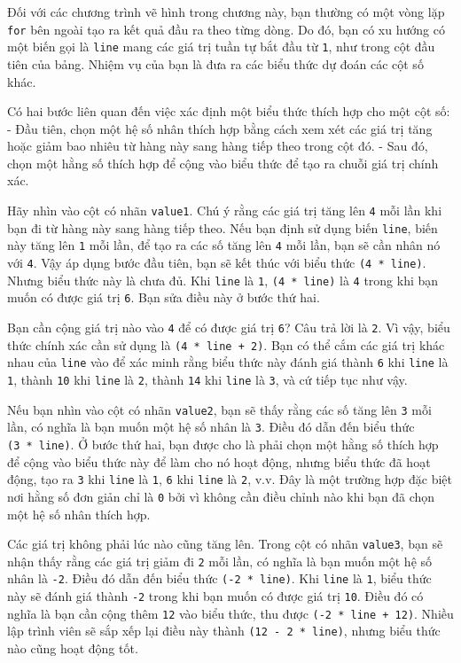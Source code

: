 Đối với các chương trình vẽ hình trong chương này, bạn thường có một
vòng lặp \texttt{for} bên ngoài tạo ra kết quả đầu ra theo từng dòng. Do
đó, bạn có xu hướng có một biến gọi là \texttt{line} mang các giá trị
tuần tự bắt đầu từ \texttt{1}, như trong cột đầu tiên của bảng. Nhiệm vụ
của bạn là đưa ra các biểu thức dự đoán các cột số khác.

Có hai bước liên quan đến việc xác định một biểu thức thích hợp cho một
cột số: - Đầu tiên, chọn một hệ số nhân thích hợp bằng cách xem xét các
giá trị tăng hoặc giảm bao nhiêu từ hàng này sang hàng tiếp theo trong
cột đó. - Sau đó, chọn một hằng số thích hợp để cộng vào biểu thức để
tạo ra chuỗi giá trị chính xác.

Hãy nhìn vào cột có nhãn \texttt{value1}. Chú ý rằng các giá trị tăng
lên \texttt{4} mỗi lần khi bạn đi từ hàng này sang hàng tiếp theo. Nếu
bạn định sử dụng biến \texttt{line}, biến này tăng lên \texttt{1} mỗi
lần, để tạo ra các số tăng lên \texttt{4} mỗi lần, bạn sẽ cần nhân nó
với \texttt{4}. Vậy áp dụng bước đầu tiên, bạn sẽ kết thúc với biểu thức
\texttt{(4\ *\ line)}. Nhưng biểu thức này là chưa đủ. Khi \texttt{line}
là \texttt{1}, \texttt{(4\ *\ line)} là \texttt{4} trong khi bạn muốn có
được giá trị \texttt{6}. Bạn sửa điều này ở bước thứ hai.

Bạn cần cộng giá trị nào vào \texttt{4} để có được giá trị \texttt{6}?
Câu trả lời là \texttt{2}. Vì vậy, biểu thức chính xác cần sử dụng là
\texttt{(4\ *\ line\ +\ 2)}. Bạn có thể cắm các giá trị khác nhau của
\texttt{line} vào để xác minh rằng biểu thức này đánh giá thành
\texttt{6} khi \texttt{line} là \texttt{1}, thành \texttt{10} khi
\texttt{line} là \texttt{2}, thành \texttt{14} khi \texttt{line} là
\texttt{3}, và cứ tiếp tục như vậy.

Nếu bạn nhìn vào cột có nhãn \texttt{value2}, bạn sẽ thấy rằng các số
tăng lên \texttt{3} mỗi lần, có nghĩa là bạn muốn một hệ số nhân là
\texttt{3}. Điều đó dẫn đến biểu thức \texttt{(3\ *\ line)}. Ở bước thứ
hai, bạn được cho là phải chọn một hằng số thích hợp để cộng vào biểu
thức này để làm cho nó hoạt động, nhưng biểu thức đã hoạt động, tạo ra
\texttt{3} khi \texttt{line} là \texttt{1}, \texttt{6} khi \texttt{line}
là \texttt{2}, v.v. Đây là một trường hợp đặc biệt nơi hằng số đơn giản
chỉ là \texttt{0} bởi vì không cần điều chỉnh nào khi bạn đã chọn một hệ
số nhân thích hợp.

Các giá trị không phải lúc nào cũng tăng lên. Trong cột có nhãn
\texttt{value3}, bạn sẽ nhận thấy rằng các giá trị giảm đi \texttt{2}
mỗi lần, có nghĩa là bạn muốn một hệ số nhân là \texttt{-2}. Điều đó dẫn
đến biểu thức \texttt{(-2\ *\ line)}. Khi \texttt{line} là \texttt{1},
biểu thức này sẽ đánh giá thành \texttt{-2} trong khi bạn muốn có được
giá trị \texttt{10}. Điều đó có nghĩa là bạn cần cộng thêm \texttt{12}
vào biểu thức, thu được \texttt{(-2\ *\ line\ +\ 12)}. Nhiều lập trình
viên sẽ sắp xếp lại điều này thành \texttt{(12\ -\ 2\ *\ line)}, nhưng
biểu thức nào cũng hoạt động tốt.

